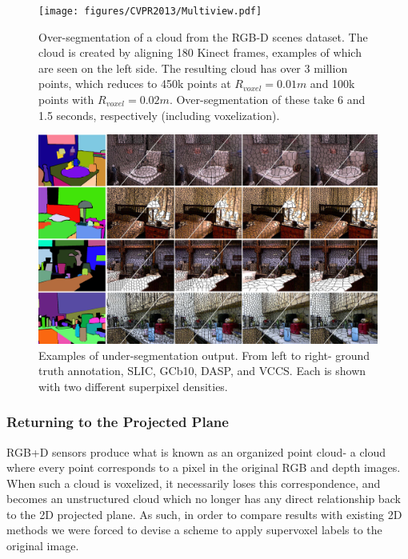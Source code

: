 \begin{figure}
\begin{center}
\texttt{[image: figures/CVPR2013/Multiview.pdf]}
\end{center}
   \caption[Supervoxels from Multiple Views]{Over-segmentation of a cloud from the RGB-D scenes dataset\cite{RGBDDataset}. The cloud is created by aligning 180 Kinect frames, examples of which are seen on the left side. The resulting cloud has over 3 million points, which reduces to 450k points at ${R}_{voxel}=0.01m$ and 100k points with ${R}_{voxel}=0.02m$. Over-segmentation of these take 6 and 1.5 seconds, respectively (including voxelization).}
\label{fig:MultiViewCloud}
\end{figure}

\begin{figure}
\begin{center}
\includegraphics[width=1.01\linewidth]{figures/CVPR2013/Comparison_Segmentation_Small.pdf}
\end{center}
   \caption[Superpixel Comparison]{Examples of under-segmentation output. From left to right- ground truth annotation, SLIC, GCb10, DASP, and VCCS. Each is shown with two different superpixel densities.}
\label{fig:ExampleSegmentations}
\end{figure}

\subsubsection{Returning to the Projected Plane}
RGB+D sensors produce what is known as an organized point cloud- a cloud where every point corresponds to a pixel in the original RGB and depth images. When such a cloud is voxelized, it necessarily loses this correspondence, and becomes an unstructured cloud which no longer has any direct relationship back to the 2D projected plane. As such, in order to compare results with existing 2D methods we were forced to devise a scheme to apply supervoxel labels to the original image. 

